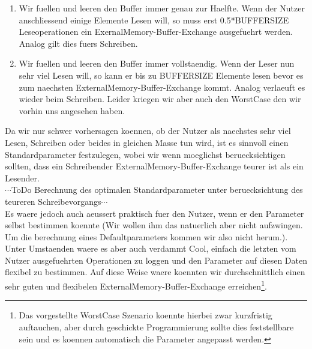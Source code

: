\documentclass[10pt,a4paper]{article}
\begin{document}
\begin{enumerate}
\item Wir fuellen und leeren den Buffer immer genau zur Haelfte. Wenn der Nutzer anschliessend einige Elemente Lesen will, so muss erst 0.5*BUFFERSIZE Leseoperationen ein ExernalMemory-Buffer-Exchange ausgefuehrt werden. Analog gilt dies fuers Schreiben.
\item Wir fuellen und leeren den Buffer immer vollstaendig. Wenn der Leser nun sehr viel Lesen will, so kann er bis zu BUFFERSIZE Elemente lesen bevor es zum naechsten ExternalMemory-Buffer-Exchange kommt. Analog verlaeuft es wieder beim Schreiben. Leider kriegen wir aber auch den WorstCase den wir vorhin uns angesehen haben.
\end{enumerate}
Da wir nur schwer vorhersagen koennen, ob der Nutzer als naechstes sehr viel Lesen, Schreiben oder beides in gleichen Masse tun wird, ist es sinnvoll einen Standardparameter festzulegen, wobei wir wenn moeglichst beruecksichtigen sollten, dass ein Schreibender ExternalMemory-Buffer-Exchange teurer ist als ein Lesender.\\
$\cdots$ToDo Berechnung des optimalen Standardparameter unter beruecksichtung des teureren Schreibevorgangs$\cdots$\\
Es waere jedoch auch aeussert praktisch fuer den Nutzer, wenn er den Parameter selbst bestimmen koennte (Wir wollen ihm das natuerlich aber nicht aufzwingen. Um die berechnung eines Defaultparameters kommen wir also nicht herum.). Unter Umstaenden waere es aber auch verdammt Cool, einfach die letzten vom Nutzer ausgefuehrten Operationen zu loggen und  den Parameter auf diesen Daten flexibel zu bestimmen. Auf diese Weise waere koennten wir durchschnittlich einen sehr guten und flexibelen ExternalMemory-Buffer-Exchange erreichen\footnote{Das vorgestellte WorstCase Szenario koennte hierbei zwar kurzfristig auftauchen, aber durch geschickte Programmierung sollte dies feststellbare sein und es koennen automatisch die Parameter angepasst werden.}.
\end{document}
